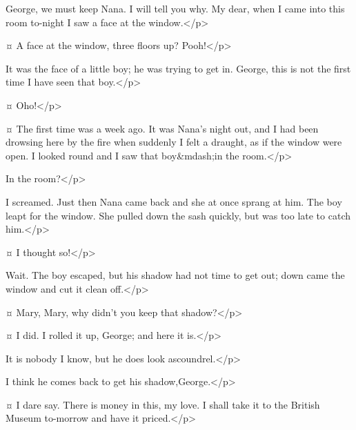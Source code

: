 \mrsdarlingspeaks
George, we must keep Nana. I will tell you why.
My dear, when I came into this room to-night I saw a face at the window.</p>

\mrdarlingspeaks {}¤
A face at the window, three floors up? Pooh!</p>

\mrsdarlingspeaks
It was the face of a little boy; he was trying to get in. George, this is not the first time I have seen that boy.</p>

\mrdarlingspeaks {}¤
Oho!</p>

\mrsdarlingspeaks {}¤
The first time was a week ago. It was Nana's night out, and I had been drowsing here by the fire when suddenly I felt a draught, as if the window were open. I looked round and I saw that boy&mdash;in the room.</p>

\mrdarlingspeaks
In the room?</p>

\mrsdarlingspeaks
I screamed. Just then Nana came back and she at once sprang at him. The boy leapt for the window. She pulled down the sash quickly, but was too late to catch him.</p>

\mrdarlingspeaks {}¤
I thought so!</p>

\mrsdarlingspeaks
Wait. The boy escaped, but his shadow had not time to get out; down came the window and cut it clean off.</p>

\mrdarlingspeaks {}¤
Mary, Mary, why didn't you keep that shadow?</p>

\mrsdarlingspeaks {}¤
I did. I rolled it up, George; and here it is.</p>


\mrdarlingspeaks
It is nobody I know, but he does look ascoundrel.</p>

\mrsdarlingspeaks
I think he comes back to get his shadow,George.</p>

\mrdarlingspeaks {}¤
I dare say.
There is money in this, my love. I shall take it to the British Museum to-morrow and have it priced.</p>

